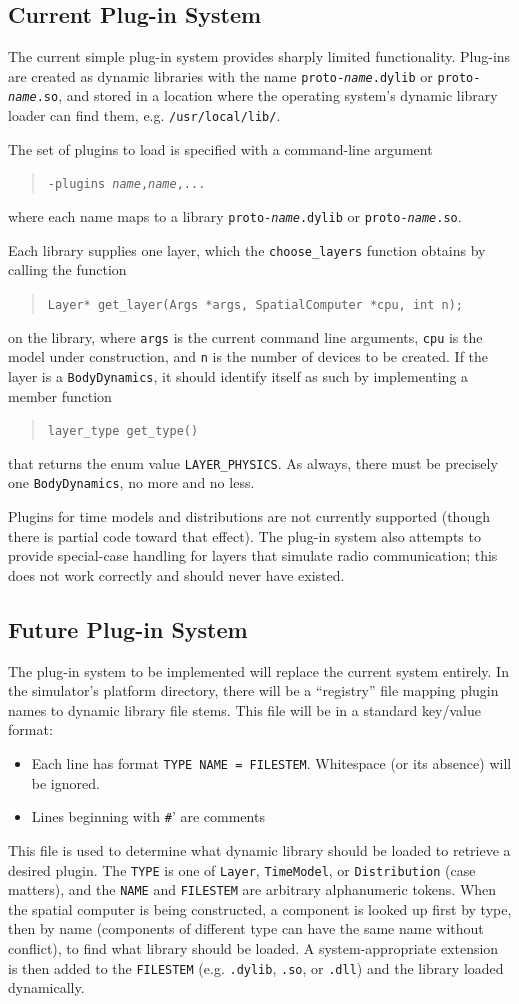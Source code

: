 \documentclass{article}
\newcommand\code[1]{\begin{quote}\var{#1}\end{quote}}
\newcommand\var[1]{{\tt #1}}
\begin{document}
\subsection{Current Plug-in System}

The current simple plug-in system provides sharply limited
functionality.  Plug-ins are created as dynamic libraries with the
name \var{proto-{\it name}.dylib} or \var{proto-{\it name}.so}, and
stored in a location where the operating system's dynamic library
loader can find them, e.g. {\tt /usr/local/lib/}.

The set of plugins to load is specified with a command-line argument
\code{-plugins {\it name},{\it name},...}
where each name maps to a library \var{proto-{\it name}.dylib} or
\var{proto-{\it name}.so}.

Each library supplies one layer, which the \var{choose\_layers}
function obtains by calling the function \code{Layer* get\_layer(Args
  *args, SpatialComputer *cpu, int n);} on the library, where
\var{args} is the current command line arguments, \var{cpu} is the
model under construction, and \var{n} is the number of devices to be
created.  If the layer is a \var{BodyDynamics}, it should identify
itself as such by implementing a member function \code{layer\_type
  get\_type()} that returns the enum value \var{LAYER\_PHYSICS}.  As
always, there must be precisely one \var{BodyDynamics}, no more and no
less.

Plugins for time models and distributions are not currently supported
(though there is partial code toward that effect).  The plug-in system
also attempts to provide special-case handling for layers that
simulate radio communication; this does not work correctly and should
never have existed.


\subsection{Future Plug-in System}

The plug-in system to be implemented will replace the current system
entirely.  In the simulator's platform directory, there will be a
``registry'' file mapping plugin names to dynamic library file stems.
This file will be in a standard key/value format:
\begin{itemize}
\item Each line has format {\tt TYPE NAME = FILESTEM}.  Whitespace (or its
  absence) will be ignored.
\item Lines beginning with {\tt \#}' are comments
\end{itemize}
This file is used to determine what dynamic library should be loaded
to retrieve a desired plugin.  The \var{TYPE} is one of \var{Layer},
\var{TimeModel}, or \var{Distribution} (case matters), and the
\var{NAME} and \var{FILESTEM} are arbitrary alphanumeric tokens.  When
the spatial computer is being constructed, a component is looked up
first by type, then by name (components of different type can have the
same name without conflict), to find what library should be loaded.  A
system-appropriate extension is then added to the \var{FILESTEM}
(e.g. \var{.dylib}, \var{.so}, or \var{.dll}) and the library loaded
dynamically.
\end{document}

